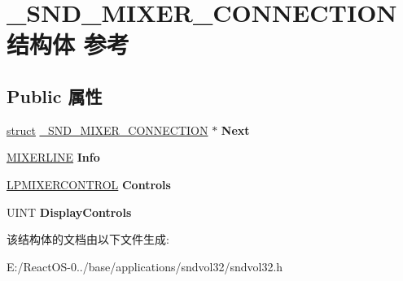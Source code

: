 \hypertarget{struct___s_n_d___m_i_x_e_r___c_o_n_n_e_c_t_i_o_n}{}\section{\+\_\+\+S\+N\+D\+\_\+\+M\+I\+X\+E\+R\+\_\+\+C\+O\+N\+N\+E\+C\+T\+I\+O\+N结构体 参考}
\label{struct___s_n_d___m_i_x_e_r___c_o_n_n_e_c_t_i_o_n}
\subsection*{Public 属性}
\begin{DoxyCompactItemize}
\item 
\mbox{\label{struct___s_n_d___m_i_x_e_r___c_o_n_n_e_c_t_i_o_n_a070bdfd520f233de3e69d14c7ee4165b}} 
\hyperlink{interfacestruct}{struct} \hyperlink{struct___s_n_d___m_i_x_e_r___c_o_n_n_e_c_t_i_o_n}{\+\_\+\+S\+N\+D\+\_\+\+M\+I\+X\+E\+R\+\_\+\+C\+O\+N\+N\+E\+C\+T\+I\+ON} $\ast$ {\bfseries Next}
\item 
\mbox{\label{struct___s_n_d___m_i_x_e_r___c_o_n_n_e_c_t_i_o_n_a01b6470b2bb38173f664c062731531de}} 
\hyperlink{structtag_m_i_x_e_r_l_i_n_e_a}{M\+I\+X\+E\+R\+L\+I\+NE} {\bfseries Info}
\item 
\mbox{\label{struct___s_n_d___m_i_x_e_r___c_o_n_n_e_c_t_i_o_n_a2a0603aeab1481968a114f6a267c3e55}} 
\hyperlink{structtag_m_i_x_e_r_c_o_n_t_r_o_l_a}{L\+P\+M\+I\+X\+E\+R\+C\+O\+N\+T\+R\+OL} {\bfseries Controls}
\item 
\mbox{\label{struct___s_n_d___m_i_x_e_r___c_o_n_n_e_c_t_i_o_n_a29e34265c159158857a03336fb40c338}} 
U\+I\+NT {\bfseries Display\+Controls}
\end{DoxyCompactItemize}


该结构体的文档由以下文件生成\+:\begin{DoxyCompactItemize}
\item 
E\+:/\+React\+O\+S-\/0../base/applications/sndvol32/sndvol32.\+h\end{DoxyCompactItemize}

